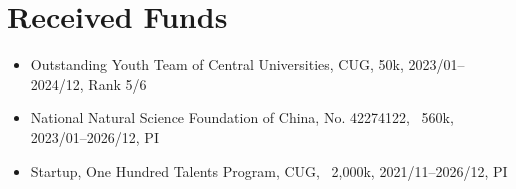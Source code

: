 \section{Received Funds}

\begin{itemize}
\item Outstanding Youth Team of Central Universities, CUG, \textyen 50k, 2023/01--2024/12, Rank 5/6
\item National Natural Science Foundation of China, No. 42274122, \textyen\ 560k, 2023/01--2026/12, PI
\item Startup, One Hundred Talents Program, CUG, \textyen\ 2,000k, 2021/11--2026/12, PI
\end{itemize}
